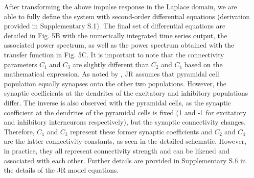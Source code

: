 \documentclass[12pt,twoside]{article}
\begin{document}
After transforming the above impulse response in the Laplace domain, we are able to fully define the system with second-order differential equations (derivation provided in Supplementary S.1). The final set of differential equations are detailed in Fig. 5B with the numerically integrated time series output, the associated power spectrum, as well as the power spectrum obtained with the transfer function in Fig. 5C.
It is important to note that the connectivity parameters $C_{1}$ and $C_{3}$ are slightly different than $C_{2}$ and $C_{4}$ based on the mathematical expression. As noted by \citet{cook2021neural}, JR assumes that pyramidal cell population equally synapses onto the other two populations. However, the synaptic coefficients at the dendrites of the excitatory and inhibitory populations differ. The inverse is also observed with the pyramidal cells, as the synaptic coefficient at the dendrites of the pyramidal cells is fixed (1 and -1 for excitatory and inhibitory interneurons respectively), but the synaptic connectivity changes. Therefore, $C_{1}$ and $C_{3}$ represent these former synaptic coefficients and $C_{2}$ and $C_{4}$ are the latter connectivity constants, as seen in the detailed schematic. However, in practice, they all represent connectivity strength and can be likened and associated with each other. Further details are provided in Supplementary S.6 in the details of the JR model equations. 
\end{document}
